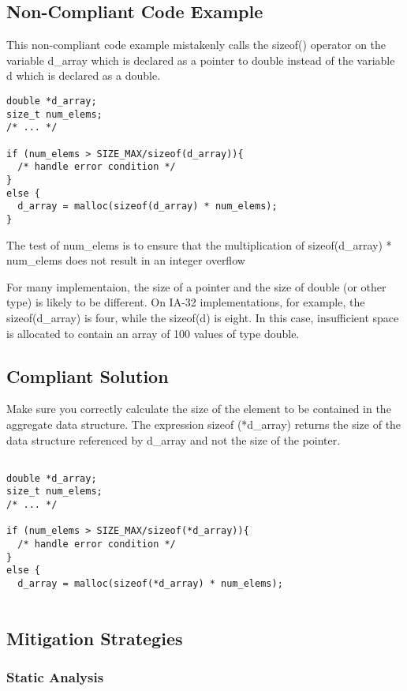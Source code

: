 \subsection{Non-Compliant Code Example}

This non-compliant code example mistakenly calls the sizeof() operator
on the variable d\_array which is declared as a pointer to double
instead of the variable d which is declared as a double.
\begin{verbatim}
double *d_array;
size_t num_elems;
/* ... */

if (num_elems > SIZE_MAX/sizeof(d_array)){
  /* handle error condition */
}
else {
  d_array = malloc(sizeof(d_array) * num_elems);
}
\end{verbatim}
The test of num\_elems is to ensure that the multiplication of
sizeof(d\_array) * num\_elems does not result in an integer overflow

For many implementaion, the size of a pointer and the size of double
(or other type) is likely to be different. On IA-32 implementations,
for example, the sizeof(d\_array) is four, while the sizeof(d) is
eight. In this case, insufficient space is allocated to contain an
array of 100 values of type double.

\subsection{Compliant Solution}

Make sure you correctly calculate the size of the element to be
contained in the aggregate data structure. The expression sizeof
(*d\_array) returns the size of the data structure referenced by
d\_array and not the size of the pointer.
\begin{verbatim}

double *d_array;
size_t num_elems;
/* ... */

if (num_elems > SIZE_MAX/sizeof(*d_array)){
  /* handle error condition */
}
else {
  d_array = malloc(sizeof(*d_array) * num_elems);


\end{verbatim}

\subsection{Mitigation Strategies}
\subsubsection{Static Analysis} 

